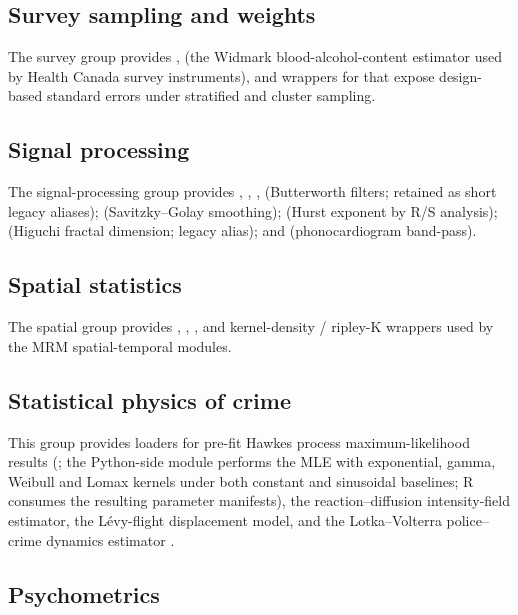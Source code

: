 \documentclass[article,shortnames,nojss]{jss}
\begin{document}
\subsection{Survey sampling and weights}

The survey group provides ,
 (the Widmark blood-alcohol-content
estimator used by Health Canada survey instruments), and wrappers
for  that expose design-based standard errors under
stratified and cluster sampling.

\subsection{Signal processing}

The signal-processing group provides ,
, ,  (Butterworth
filters; retained as short legacy aliases);
 (Savitzky--Golay smoothing);
 (Hurst exponent by R/S analysis);
 (Higuchi fractal dimension; legacy alias); and
 (phonocardiogram band-pass).

\subsection{Spatial statistics}

The spatial group provides ,
,
, and kernel-density / ripley-K wrappers used by
the MRM spatial-temporal modules.

\subsection{Statistical physics of crime}

This group provides loaders for pre-fit Hawkes process maximum-likelihood
results (; the Python-side
 module performs the MLE with
exponential, gamma, Weibull and Lomax kernels under both constant and
sinusoidal baselines; R consumes the resulting parameter manifests),
the reaction--diffusion intensity-field estimator, the L\'evy-flight
displacement model, and the Lotka--Volterra police--crime dynamics
estimator \citep{Mohler2011, Ruhela2026Hawkes}.

\subsection{Psychometrics}
\end{document}
